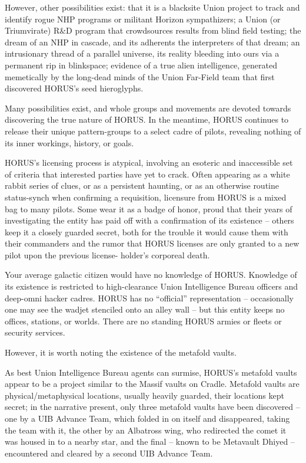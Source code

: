 However, other possibilities exist: that it is a blacksite Union project to track and identify rogue
NHP programs or militant Horizon sympathizers; a Union (or Triumvirate) R\&D program that
crowdsources results from blind field testing; the dream of an NHP in cascade, and its adherents
the interpreters of that dream; an intrusionary thread of a parallel universe, its reality bleeding into
ours via a permanent rip in blinkspace; evidence of a true alien intelligence, generated
memetically by the long-dead minds of the Union Far-Field team that first discovered HORUS's
seed hieroglyphs.

Many possibilities exist, and whole groups and movements are devoted towards discovering the
true nature of HORUS. In the meantime, HORUS continues to release their unique pattern-groups
to a select cadre of pilots, revealing nothing of its inner workings, history, or goals.

HORUS's licensing process is atypical, involving an esoteric and inaccessible set of criteria that
interested parties have yet to crack. Often appearing as a white rabbit series of clues, or as a
persistent haunting, or as an otherwise routine status-synch when confirming a requisition,
licensure from HORUS is a mixed bag to many pilots. Some wear it as a badge of honor, proud
that their years of investigating the entity has paid off with a confirmation of its existence -- others
keep it a closely guarded secret, both for the trouble it would cause them with their commanders
and the rumor that HORUS licenses are only granted to a new pilot upon the previous license-
holder's corporeal death.

Your average galactic citizen would have no knowledge of HORUS. Knowledge of its existence is
restricted to high-clearance Union Intelligence Bureau officers and deep-omni hacker cadres.
HORUS has no ``official'' representation -- occasionally one may see the wadjet stenciled onto an
alley wall -- but this entity keeps no offices, stations, or worlds. There are no standing HORUS
armies or fleets or security services.

However, it is worth noting the existence of the metafold vaults.

As best Union Intelligence Bureau agents can surmise, HORUS's metafold vaults appear to be a
project similar to the Massif vaults on Cradle. Metafold vaults are physical/metaphysical locations,
usually heavily guarded, their locations kept secret; in the narrative present, only three metafold
vaults have been discovered -- one by a UIB Advance Team, which folded in on itself and
disappeared, taking the team with it, the other by an Albatross wing, who redirected the comet it
was housed in to a nearby star, and the final -- known to be Metavault Dhiyed -- encountered and
cleared by a second UIB Advance Team.

